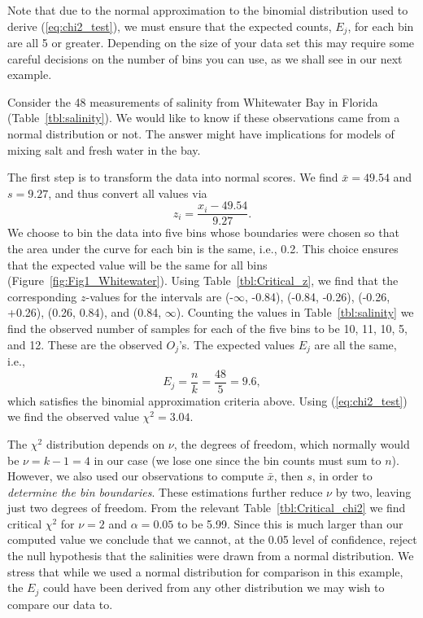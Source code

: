 Note that due to the normal approximation to the binomial distribution used to derive (\ref{eq:chi2_test}), we must ensure that the expected
counts, $E_j$, for each bin are all 5 or greater.  Depending on the size of your data set this may require some careful
decisions on the number of bins you can use, as we shall see in our next example.
\begin{example}
Consider the 48 measurements of salinity from Whitewater Bay in Florida (Table~\ref{tbl:salinity}). We would like to
know if these observations came from a normal distribution or not.  The 
answer might have implications for models of mixing salt and fresh water in the bay.

	The first step is to transform the data into normal scores.  We find $\bar{x}  = 49.54$ and $s = 9.27$, and
thus convert all values via
\begin{equation}
z_i = \frac{x_i - 49.54}{9.27}.
\end{equation}	 
We choose to bin the data into five bins whose boundaries were chosen so that the area under the curve for each bin is the 
same, i.e., 0.2.  This choice ensures that the expected value will be the same for all bins (Figure~\ref{fig:Fig1_Whitewater}).
Using Table~\ref{tbl:Critical_z}, we find that the corresponding $z$-values 
for the intervals are (-$\infty$, -0.84), (-0.84, -0.26), (-0.26, +0.26), (0.26, 0.84), and (0.84, $\infty$).  Counting 
the values in Table~\ref{tbl:salinity} we find the observed number of samples for each of the five bins to be 10, 11, 
10, 5, and 12.  These are the observed $O_j$'s.  The expected values $E_j$ are all the same, i.e.,
\begin{equation}
E_j = \frac{n}{k} = \frac{48}{5} = 9.6,
\end{equation}
which satisfies the binomial approximation criteria above.
Using (\ref{eq:chi2_test}) we find the observed value $\chi^2 = 3.04$.

	The $\chi^2$ distribution depends on $\nu$, the degrees of freedom, which normally would be 
$\nu = k - 1 = 4$ in 
our case (we lose one since the bin counts must sum to $n$).  However, we also used our observations to
compute $\bar{x}$, then $s$, in order to \emph{determine the bin boundaries}.  These estimations further reduce $\nu$ by two, leaving 
just two degrees of freedom.  From the relevant Table~\ref{tbl:Critical_chi2} we find critical $\chi^2$ for $\nu = 2$ and $\alpha = 0.05$ to be 
5.99.  Since this is much larger than our computed value we conclude that we cannot, at the 0.05 level of confidence, reject the 
null hypothesis that the salinities were drawn from a normal distribution. 
We stress that while we used a normal distribution for comparison in this example, the $E_j$ could have 
been derived from any other distribution we may wish to compare our data to. 
\end{example}

